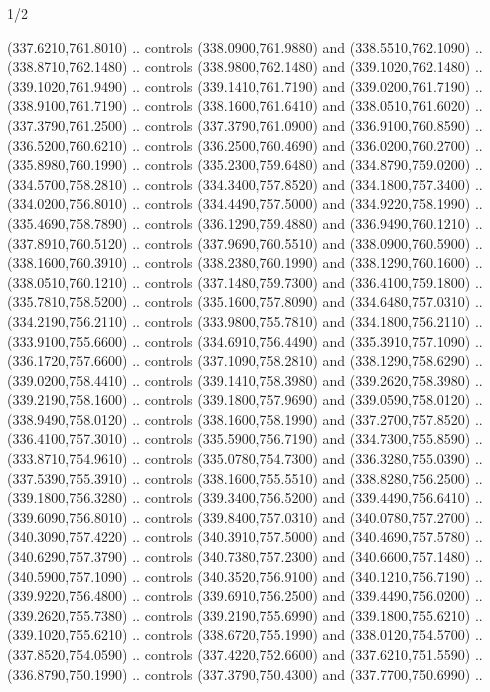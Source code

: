 \begin{flagdescription}{1/2}
\begin{scope}[xshift=0.5\flaglength]
\begin{scope}[scale=0.00745\flagwidth,xshift=-12.1mm,yshift=41.7mm]
\begin{scope}[y=0.80pt, x=0.80pt, yscale=-1, xscale=1, inner sep=0pt, outer sep=0pt]
\begin{scope}[cm={{1.33333,0.0,0.0,-1.33333,(0.0,114.66667)}}]
\begin{scope}[scale=0.100]
  (337.6210,761.8010) .. controls (338.0900,761.9880) and (338.5510,762.1090) ..
  (338.8710,762.1480) .. controls (338.9800,762.1480) and (339.1020,762.1480) ..
  (339.1020,761.9490) .. controls (339.1410,761.7190) and (339.0200,761.7190) ..
  (338.9100,761.7190) .. controls (338.1600,761.6410) and (338.0510,761.6020) ..
  (337.3790,761.2500) .. controls (337.3790,761.0900) and (336.9100,760.8590) ..
  (336.5200,760.6210) .. controls (336.2500,760.4690) and (336.0200,760.2700) ..
  (335.8980,760.1990) .. controls (335.2300,759.6480) and (334.8790,759.0200) ..
  (334.5700,758.2810) .. controls (334.3400,757.8520) and (334.1800,757.3400) ..
  (334.0200,756.8010) .. controls (334.4490,757.5000) and (334.9220,758.1990) ..
  (335.4690,758.7890) .. controls (336.1290,759.4880) and (336.9490,760.1210) ..
  (337.8910,760.5120) .. controls (337.9690,760.5510) and (338.0900,760.5900) ..
  (338.1600,760.3910) .. controls (338.2380,760.1990) and (338.1290,760.1600) ..
  (338.0510,760.1210) .. controls (337.1480,759.7300) and (336.4100,759.1800) ..
  (335.7810,758.5200) .. controls (335.1600,757.8090) and (334.6480,757.0310) ..
  (334.2190,756.2110) .. controls (333.9800,755.7810) and (334.1800,756.2110) ..
  (333.9100,755.6600) .. controls (334.6910,756.4490) and (335.3910,757.1090) ..
  (336.1720,757.6600) .. controls (337.1090,758.2810) and (338.1290,758.6290) ..
  (339.0200,758.4410) .. controls (339.1410,758.3980) and (339.2620,758.3980) ..
  (339.2190,758.1600) .. controls (339.1800,757.9690) and (339.0590,758.0120) ..
  (338.9490,758.0120) .. controls (338.1600,758.1990) and (337.2700,757.8520) ..
  (336.4100,757.3010) .. controls (335.5900,756.7190) and (334.7300,755.8590) ..
  (333.8710,754.9610) .. controls (335.0780,754.7300) and (336.3280,755.0390) ..
  (337.5390,755.3910) .. controls (338.1600,755.5510) and (338.8280,756.2500) ..
  (339.1800,756.3280) .. controls (339.3400,756.5200) and (339.4490,756.6410) ..
  (339.6090,756.8010) .. controls (339.8400,757.0310) and (340.0780,757.2700) ..
  (340.3090,757.4220) .. controls (340.3910,757.5000) and (340.4690,757.5780) ..
  (340.6290,757.3790) .. controls (340.7380,757.2300) and (340.6600,757.1480) ..
  (340.5900,757.1090) .. controls (340.3520,756.9100) and (340.1210,756.7190) ..
  (339.9220,756.4800) .. controls (339.6910,756.2500) and (339.4490,756.0200) ..
  (339.2620,755.7380) .. controls (339.2190,755.6990) and (339.1800,755.6210) ..
  (339.1020,755.6210) .. controls (338.6720,755.1990) and (338.0120,754.5700) ..
  (337.8520,754.0590) .. controls (337.4220,752.6600) and (337.6210,751.5590) ..
  (336.8790,750.1990) .. controls (337.3790,750.4300) and (337.7700,750.6990) ..

\end{scope}
\end{scope}
\end{scope}
\end{scope}
\end{scope}
\end{flagdescription}
